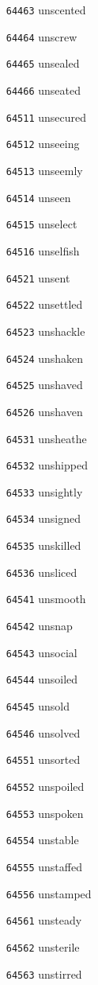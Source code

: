 \documentclass[twoside,11pt]{article}
\begin{document}
\begin{multicols}{5}
\begin{enumerate}
\item[\texttt{64463}] unscented
\item[\texttt{64464}] unscrew
\item[\texttt{64465}] unsealed
\item[\texttt{64466}] unseated
\item[\texttt{64511}] unsecured
\item[\texttt{64512}] unseeing
\item[\texttt{64513}] unseemly
\item[\texttt{64514}] unseen
\item[\texttt{64515}] unselect
\item[\texttt{64516}] unselfish
\item[\texttt{64521}] unsent
\item[\texttt{64522}] unsettled
\item[\texttt{64523}] unshackle
\item[\texttt{64524}] unshaken
\item[\texttt{64525}] unshaved
\item[\texttt{64526}] unshaven
\item[\texttt{64531}] unsheathe
\item[\texttt{64532}] unshipped
\item[\texttt{64533}] unsightly
\item[\texttt{64534}] unsigned
\item[\texttt{64535}] unskilled
\item[\texttt{64536}] unsliced
\item[\texttt{64541}] unsmooth
\item[\texttt{64542}] unsnap
\item[\texttt{64543}] unsocial
\item[\texttt{64544}] unsoiled
\item[\texttt{64545}] unsold
\item[\texttt{64546}] unsolved
\item[\texttt{64551}] unsorted
\item[\texttt{64552}] unspoiled
\item[\texttt{64553}] unspoken
\item[\texttt{64554}] unstable
\item[\texttt{64555}] unstaffed
\item[\texttt{64556}] unstamped
\item[\texttt{64561}] unsteady
\item[\texttt{64562}] unsterile
\item[\texttt{64563}] unstirred

\end{enumerate}
\end{multicols}
\end{document}
